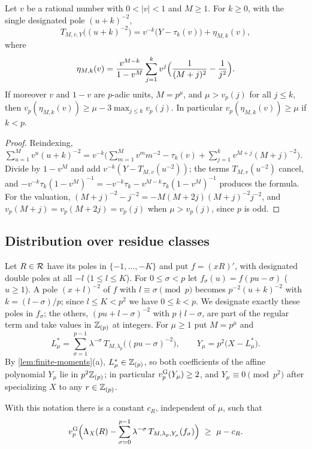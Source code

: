 \begin{lemma}\label{lem:pole-regularization}
Let $v$ be a rational number with $0<|v|<1$ and $M\ge1$. For $k\ge0$, with the single designated pole $(u+k)^{-2}$,
\[
T_{M,v,Y}\bigl((u+k)^{-2}\bigr)=v^{-k}\bigl(Y-\tau_k(v)\bigr)+\eta_{M,k}(v),
\]
where
\[
\eta_{M,k}(v)=\frac{v^{M-k}}{1-v^M}\sum_{j=1}^kv^j\Bigl(\frac1{(M+j)^2}-\frac1{j^2}\Bigr).
\]
If moreover $v$ and $1-v$ are $p$-adic units, $M=p^\mu$, and $\mu>v_p(j)$ for all $j\le k$, then $v_p(\eta_{M,k}(v))\ge \mu-3\max_{j\le k}v_p(j)$. In particular $v_p(\eta_{M,k}(v))\ge \mu$ if $k<p$.
\end{lemma}

\begin{proof}
Reindexing, $\sum_{u=1}^Mv^u(u+k)^{-2}=v^{-k}\bigl(\sum_{m=1}^Mv^mm^{-2}-\tau_k(v)+\sum_{j=1}^kv^{M+j}(M+j)^{-2}\bigr)$. Divide by $1-v^M$ and add $v^{-k}(Y-T_{M,v}(u^{-2}))$; the terms $T_{M,v}(u^{-2})$ cancel, and $-v^{-k}\tau_k(1-v^M)^{-1}=-v^{-k}\tau_k-v^{M-k}\tau_k(1-v^M)^{-1}$ produces the formula. For the valuation, $(M+j)^{-2}-j^{-2}=-M(M+2j)(M+j)^{-2}j^{-2}$, and $v_p(M+j)=v_p(M+2j)=v_p(j)$ when $\mu>v_p(j)$, since $p$ is odd.
\end{proof}

\subsection{Distribution over residue classes}\label{sec:distribution}
Let $R\in\mathcal{R}$ have its poles in $\{-1,\dots,-K\}$ and put $f=(xR)'$, with designated double poles at all $-l$ ($1\le l\le K$). For $0\le\sigma<p$ let $f_\sigma(u)=f(pu-\sigma)$ ($u\ge1$). A pole $(x+l)^{-2}$ of $f$ with $l\equiv\sigma\pmod p$ becomes $p^{-2}(u+k)^{-2}$ with $k=(l-\sigma)/p$; since $l\le K<p^2$ we have $0\le k<p$. We designate exactly these poles in $f_\sigma$; the others, $(pu+l-\sigma)^{-2}$ with $p\nmid l-\sigma$, are part of the regular term and take values in $\mathbb{Z}_{(p)}$ at integers. For $\mu\ge1$ put $M=p^\mu$ and
\[
L^*_\mu=\sum_{\sigma=1}^{p-1}\lambda^{-\sigma}\,T_{M,\lambda_p}\bigl((pu-\sigma)^{-2}\bigr),\qquad Y_\mu=p^2\bigl(X-L^*_\mu\bigr).
\]
By \cref{lem:finite-moments}(a), $L^*_\mu\in\mathbb{Z}_{(p)}$, so both coefficients of the affine polynomial $Y_\mu$ lie in $p^2\mathbb{Z}_{(p)}$; in particular $v^{\mathrm{G}}_{p}(Y_\mu)\ge2$, and $Y_\mu\equiv0\pmod{p^2}$ after specializing $X$ to any $r\in\mathbb{Z}_{(p)}$.

\begin{proposition}[distribution]\label{prop:distribution}
With this notation there is a constant $c_R$, independent of $\mu$, such that
\[
\vg p\Bigl(\Lambda_X(R)-\sum_{\sigma=0}^{p-1}\lambda^{-\sigma}\,T_{M,\lambda_p,Y_\mu}(f_\sigma)\Bigr)\ \ge\ \mu-c_R .
\]
\end{proposition}

